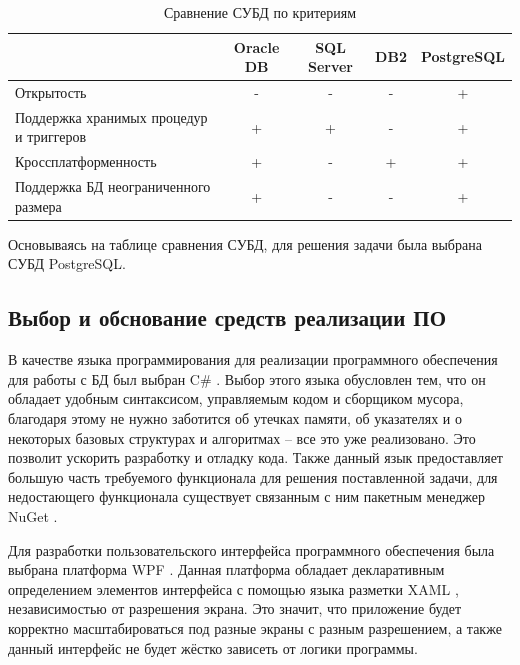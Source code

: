 \documentclass[a4paper,14pt]{extreport}
\begin{document}
\captionsetup{singlelinecheck = false, justification=raggedright}
\begin{table}[H]
	\caption{Сравнение СУБД по критериям}
	\begin{center}
		\begin{tabular}{| p{5 cm} | c | c | c | c |} 
			\hline
			
			\textbf{} & \textbf{Oracle DB} & \textbf{SQL Server} & \textbf{DB2} & \textbf{PostgreSQL} \\  
			
			\hline
			
			Открытость & - & - & - & + \\
			
			\hline
			
			Поддержка хранимых процедур и триггеров & + & + & - & + \\
			
			\hline
			
			Кроссплатформенность & + & - & + & + \\
			
			\hline
			
			Поддержка БД неограниченного размера & + & - & - & + \\
			
			\hline
		\end{tabular}
	\end{center}
\end{table}

Основываясь на таблице сравнения СУБД, для решения задачи была выбрана СУБД PostgreSQL.

\subsection*{Выбор и обснование средств реализации ПО}

В качестве языка программирования для реализации программного обеспечения для работы с БД был выбран C\# \cite{c_sharp}. Выбор этого языка обусловлен тем, что он обладает удобным синтаксисом, управляемым кодом и сборщиком мусора, благодаря этому не нужно заботится об утечках памяти, об указателях и о некоторых базовых структурах и алгоритмах -- все это уже реализовано. Это позволит ускорить разработку и отладку кода. Также данный язык предоставляет большую часть требуемого функционала для решения поставленной задачи, для недостающего функционала существует связанным с ним пакетным менеджер NuGet \cite{nuget}.

Для разработки пользовательского интерфейса программного обеспечения была выбрана платформа WPF \cite{wpf}. Данная платформа обладает декларативным определением элементов интерфейса с помощью языка разметки XAML \cite{xaml}, независимостью от разрешения экрана. Это значит, что приложение будет корректно масштабироваться под разные экраны с разным разрешением, а также данный интерфейс не будет жёстко зависеть от логики программы.
\end{document}
